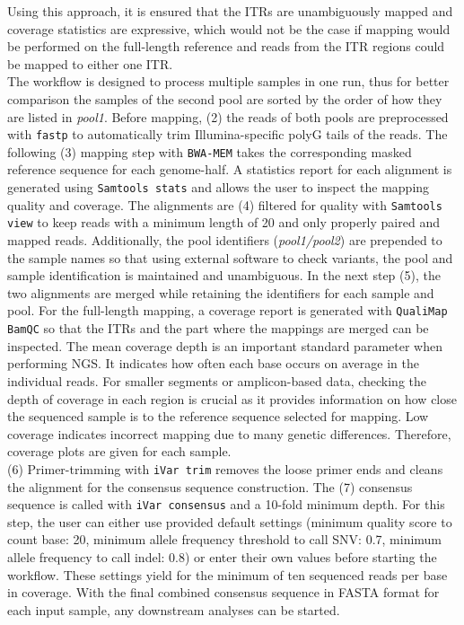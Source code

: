 Using this approach, it is ensured that the \acp{ITR} are unambiguously mapped and coverage statistics are expressive, which would not be the case if mapping would be performed on the full-length reference and reads from the \ac{ITR} regions could be mapped to either one \ac{ITR}. \\
The workflow is designed to process multiple samples in one run, thus for better comparison the samples of the second pool are sorted by the order of how they are listed in \textit{pool1}. Before mapping, (2) the reads of both pools are preprocessed with \texttt{fastp} to automatically trim Illumina-specific polyG tails of the reads. The following (3) mapping step with \texttt{BWA-MEM} takes the corresponding masked reference sequence for each genome-half. A statistics report for each alignment is generated using \texttt{Samtools stats} and allows the user to inspect the mapping quality and coverage. The alignments are (4) filtered for quality with \texttt{Samtools view} to keep reads with a minimum length of 20 and only properly paired and mapped reads. Additionally, the pool identifiers (\textit{pool1/pool2}) are prepended to the sample names so that using external software to check variants, the pool and sample identification is maintained and unambiguous. In the next step (5), the two alignments are merged while retaining the identifiers for each sample and pool. For the full-length mapping, a coverage report is generated with \texttt{QualiMap BamQC} so that the \acp{ITR} and the part where the mappings are merged can be inspected. The mean coverage depth is an important standard parameter when performing \ac{NGS}. It indicates how often each base occurs on average in the individual reads. For smaller segments or amplicon-based data, checking the depth of coverage in each region is crucial as it provides information on how close the sequenced sample is to the reference sequence selected for mapping. Low coverage indicates incorrect mapping due to many genetic differences. Therefore, coverage plots are given for each sample. \\
(6) Primer-trimming with \texttt{iVar trim} removes the loose primer ends and cleans the alignment for the consensus sequence construction. The (7) consensus sequence is called with \texttt{iVar consensus} and a 10-fold minimum depth. For this step, the user can either use provided default settings (minimum quality score to count base: 20, minimum allele frequency threshold to call \ac{SNV}: 0.7, minimum allele frequency to call indel: 0.8) or enter their own values before starting the workflow. These settings yield for the minimum of ten sequenced reads per base in coverage. With the final combined consensus sequence in FASTA format for each input sample, any downstream analyses can be started. \\

